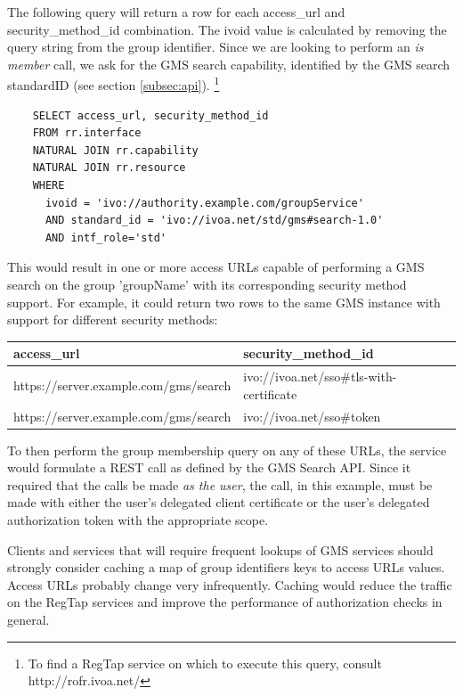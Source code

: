 \documentclass[11pt,a4paper]{ivoa}
\begin{document}
The following query will return a row for each access\_url and security\_method\_id combination.  The ivoid value is calculated by removing the query string from the group identifier.  Since we are looking to perform an \emph{is member} call, we ask for the GMS search capability, identified by the GMS search standardID (see section \ref{subsec:api}). \footnote{To find a RegTap service on which to execute this query, consult http://rofr.ivoa.net/}

\begin{verbatim}
    SELECT access_url, security_method_id
    FROM rr.interface
    NATURAL JOIN rr.capability
    NATURAL JOIN rr.resource
    WHERE
      ivoid = 'ivo://authority.example.com/groupService'
      AND standard_id = 'ivo://ivoa.net/std/gms#search-1.0'
      AND intf_role='std'
\end{verbatim}

This would result in one or more access URLs capable of performing a GMS search on the group 'groupName' with its corresponding security method support.  For example, it could return two rows to the same GMS instance with support for different security methods:

\vspace{3mm}
\hskip-1.0cm
\begin{tabular}{l l}
\textbf{access\_url} & \textbf{security\_method\_id} \\
\hline
https://server.example.com/gms/search & ivo://ivoa.net/sso\#tls-with-certificate \\
https://server.example.com/gms/search & ivo://ivoa.net/sso\#token \\
\hline
\end{tabular}
\vspace{3mm}

To then perform the group membership query on any of these URLs, the service would formulate a REST call as defined by the GMS Search API.  Since it required that the calls be made \emph{as the user}, the call, in this example, must be made with either the user's delegated client certificate or the user's delegated authorization token with the appropriate scope.

Clients and services that will require frequent lookups of GMS services should strongly consider caching a map of group identifiers keys to access URLs values. Access URLs probably change very infrequently.  Caching would reduce the traffic on the RegTap services and improve the performance of authorization checks in general. 
\end{document}

